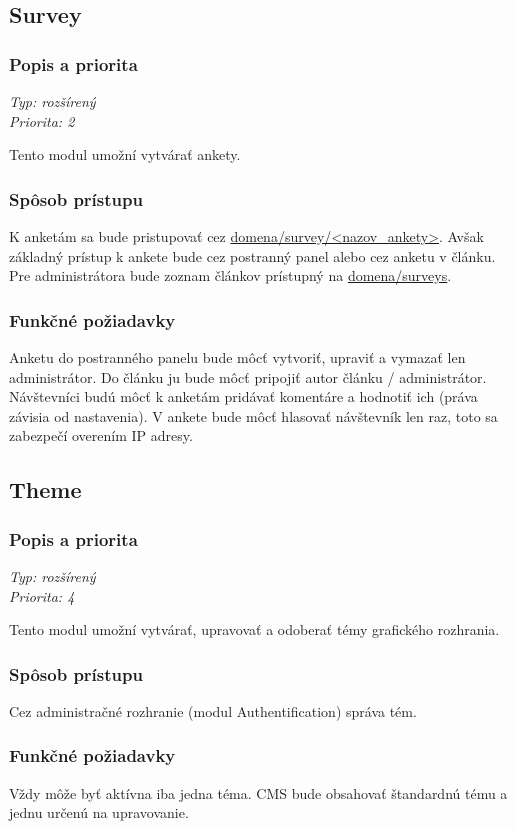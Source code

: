 \documentclass[a4paper,titlepage,11pt]{article}
\begin{document}
\subsection{Survey}
\subsubsection{Popis a priorita}
\begin{flushleft}
 \emph{Typ: rozšírený}\\
 \emph{Priorita: 2}\\
\end{flushleft}
Tento modul umožní vytvárať ankety.
\subsubsection{Spôsob prístupu}
K anketám sa bude pristupovať cez \url{domena/survey/<nazov_ankety>}.
Avšak základný prístup k ankete bude cez postranný panel alebo cez anketu v článku. 
Pre administrátora bude zoznam článkov prístupný na \url{domena/surveys}. 
\subsubsection{Funkčné požiadavky}
Anketu do postranného panelu bude môcť vytvoriť, upraviť a vymazať len administrátor. Do článku ju bude môcť pripojiť autor článku / administrátor. 
Návštevníci budú môcť k anketám pridávať komentáre a hodnotiť ich (práva závisia od nastavenia). 
V ankete bude môcť hlasovať návštevník len raz, toto sa zabezpečí overením IP adresy.

\subsection{Theme}
\subsubsection{Popis a priorita}
\begin{flushleft}
 \emph{Typ: rozšírený}\\
 \emph{Priorita: 4}\\
\end{flushleft}
Tento modul umožní vytvárať, upravovať a odoberať témy grafického rozhrania.
\subsubsection{Spôsob prístupu}
Cez administračné rozhranie (modul Authentification) správa tém.
\subsubsection{Funkčné požiadavky}
Vždy môže byť aktívna iba jedna téma. CMS bude obsahovať štandardnú tému a jednu určenú na upravovanie.
\end{document}
